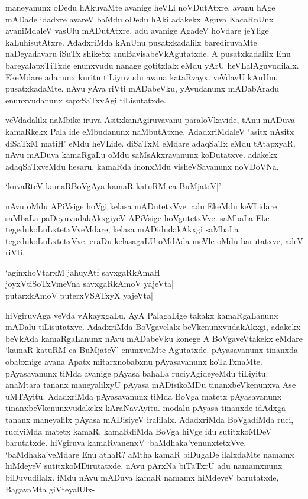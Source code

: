 maneyanunx oDedu hAkuvaMte avanige heVLi noVDutAtxre. avanu hAge mADade idadxre avareV baMdu oDedu hAki adakekx Aguva KacaRnUnx avaniMdaleV vasUlu mADutAtxre. adu avanige AgadeV hoVdare jeYlige kaLuhisutAtxre. AdadxriMda kAnUnu pusatxkadalilx barediruvaMte naDeyadavaru iSuTx shikeSx anuBavisabeVkAgutatxde. A pusatxkadalilx Enu bareyalapxTiTxde enunxvudu nanage gotitxlalx eMdu yArU heVLalAguvudilalx. EkeMdare adanunx kuritu tiLiyuvudu avana kataRvayx. veVdavU kAnUnu pusatxkadaMte. nAvu yAva riVti mADabeVku, yAvudanunx mADabAradu enunxvudanunx sapxSaTxvAgi tiLisutatxde.

veVdadalilx naMbike iruva AsitxkanAgiruvavanu paraloVkavide, tAnu mADuva kamaRkekx Pala ide eMbudanunx naMbutAtxne. AdadxriMdaleV `asitx nAsitx diSaTxM matiH' eMdu heVLide. diSaTxM eMdare adaqSaTx eMdu tAtapxyaR. nAvu mADuva kamaRgaLu oMdu saMsAkxravanunx koDutatxve. adakekx adaqSaTxveMdu hesaru. kamaRda inonxMdu visheVSavanunx noVDoVNa.

\begin{shloka}
`kuvaRteV kamaRBoVgAya kamaR katuRM ca BuMjateV|'
\end{shloka}

nAvu oMdu APiVsige hoVgi kelasa mADutetxVve. adu EkeMdu keVLidare saMbaLa paDeyuvudakAkxgiyeV APiVsige hoVgutetxVve. saMbaLa Eke tegedukoLuLxtetxVveMdare, kelasa mADidudakAkxgi saMbaLa tegedukoLuLxtetxVve. eraDu kelasagaLU oMdAda meVle oMdu barutatxve, adeV riVti,

\begin{shloka}
`aginxhoVtarxM jahuyAtf savxgaRkAmaH|\\
joyxVtiSoTxVmeVna savxgaRkAmoV yajeVta|\\
putarxkAmoV puterxVSATxyX yajeVta|
\end{shloka}

hiVgiruvAga veVda vAkayxgaLu, AyA PalagaLige takakx kamaRgaLanunx mADalu tiLisutatxve. AdadxriMda BoVgavelalx beVkenunxvudakAkxgi, adakekx beVkAda kamaRgaLanunx nAvu mADabeVku konege A BoVgaveVtakekx eMdare `kamaR katuRM ca BuMjateV' enunxvaMte Agutatxde. pAyasavanunx tinanxda obabxnige avana Apatx mitarxnobabxnu pAyasavanunx koTaTxnaMte. pAyasavanunx tiMda avanige pAyasa bahaLa ruciyAgideyeMdu tiLiyitu. anaMtara tananx maneyalilxyU pAyasa mADisikoMDu tinanxbeVkenunxva Ase uMTAyitu. AdadxriMda pAyasavanunx tiMda BoVga matetx pAyasavanunx tinanxbeVkenunxvudakekx kAraNavAyitu. modalu pAyasa tinanxde idAdxga tananx maneyalilx pAyasa mADisiyeV iralilalx. AdadxriMda BoVgadiMda ruci, ruciyiMda matetx kamaR, kamaRdiMda BoVga hiVge idu sutitxkoMDeV barutatxde. hiVgiruva kamaRvanenxV `baMdhaka'venunxtetxVve. `baMdhaka'veMdare Enu athaR? aMtha kamaR biDugaDe ilalxdaMte namamx hiMdeyeV sutitxkoMDirutatxde. nAvu pArxNa biTaTxrU adu namamxnunx biDuvudilalx. iMdu nAvu mADuva kamaR namamx hiMdeyeV barutatxde, BagavaMta giVteyalUlx-

